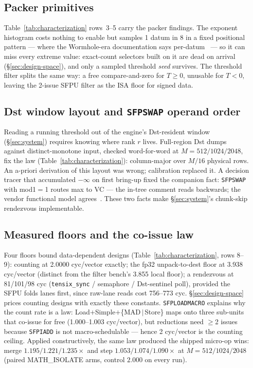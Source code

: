 \subsection{Packer primitives}
\label{sec:char-packer}

Table~\ref{tab:characterization} rows~3--5 carry the packer findings.
The exponent histogram costs nothing to enable but samples 1 datum in 8
in a fixed positional pattern --- where the Wormhole-era documentation
says per-datum~\cite{ttisadocs2025} --- so it can miss every extreme
value: exact-count selectors built on it are dead on arrival
(\S\ref{sec:design-space}), and only a sampled threshold \emph{seed}
survives. The threshold filter splits the same way: a free
compare-and-zero for $T\geq0$, unusable for $T<0$, leaving the 2-issue
SFPU filter as the ISA floor for signed data.

\subsection{Dst window layout and \texttt{SFPSWAP} operand order}
\label{sec:char-dst}

Reading a running threshold out of the engine's Dst-resident window
(\S\ref{sec:system}) requires knowing where rank $r$ lives. Full-region Dst
dumps against distinct-monotone input, checked word-for-word at
$M{=}512/1024/2048$, fix the law
(Table~\ref{tab:characterization}): column-major over $M/16$ physical
rows. An a-priori derivation of this layout was wrong; calibration replaced
it. A decision tracer that accumulated $-\infty$ on first bring-up fixed
the companion fact: \texttt{SFPSWAP} with mod1${=}$1 routes max to VC ---
the in-tree comment reads backwards; the vendor functional model
agrees~\cite{ttisadocs2025}. These two facts make
\S\ref{sec:system}'s chunk-skip rendezvous implementable.

\subsection{Measured floors and the co-issue law}
\label{sec:char-floors}

Four floors bound data-dependent designs
(Table~\ref{tab:characterization}, rows 8--9): counting at 2.0000
cyc/vector exactly; the fp32 unpack-to-dest floor at 3.938 cyc/vector
(distinct from the filter bench's 3.855 local floor); a rendezvous at
81/101/98 cyc
(\texttt{tensix\_sync} / semaphore / Dst-sentinel poll), provided the
SFPU folds lanes first, since raw-lane reads cost 756--773 cyc.
\S\ref{sec:design-space} prices counting designs with exactly these
constants. \texttt{SFPLOADMACRO} explains why the count rate is a law:
Load$+$Simple$+$\{MAD$\,|\,$Store\} maps onto three sub-units that co-issue
for free (1.000--1.003 cyc/vector), but reductions need $\geq$2 issues
because \texttt{SFPIADD} is not macro-schedulable --- hence 2 cyc/vector is
the counting ceiling. Applied constructively, the same law produced the
shipped micro-op wins: merge $1.195/1.221/1.235\times$ and step
$1.053/1.074/1.090\times$ at $M{=}512/1024/2048$ (paired MATH\_ISOLATE
arms, control $2.000$ on every run).
